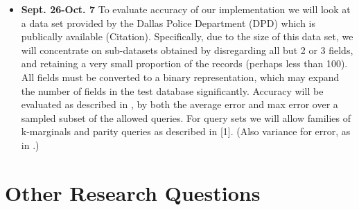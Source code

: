 \documentclass{article}
\begin{document}
\begin{itemize}
  \item \textbf{Sept. 26-Oct. 7} {To evaluate accuracy of our implementation we will look at a data set provided by the Dallas Police Department (DPD) which is publically available (Citation). Specifically, due to the size of this data set, we will concentrate on sub-datasets obtained by disregarding all but 2 or 3 fields, and retaining a very small proportion of the records (perhaps less than 100). All fields must be converted to a binary representation, which may expand the number of fields in the test database significantly. Accuracy will be evaluated as described in \cite[Pages~16-17]{DBLP:journals-corr-GaboardiAHRW14}, by both the average error and max error over a sampled subset of the allowed queries. For query sets we will allow families of k-marginals and parity queries as described in [1]. (Also variance for error, as in \cite{Hay:2016:PED:2882903.2882931}.)}
  
  
  
\end{itemize}
  
\section{Other Research Questions}
 
 
 
 
\nocite{*}
{}

\end{document}
